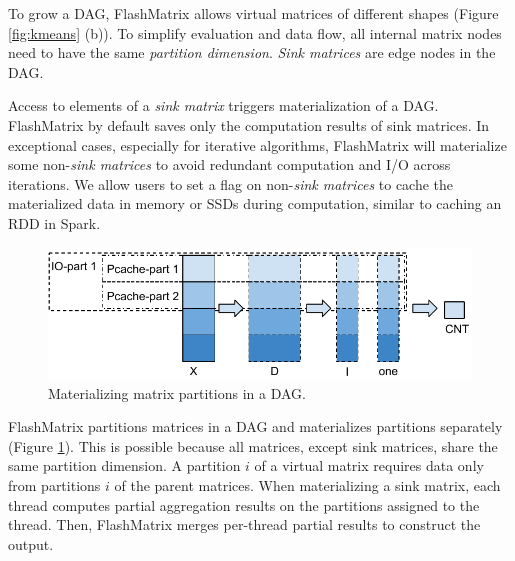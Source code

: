 To grow a DAG, FlashMatrix allows virtual matrices of different shapes
(Figure \ref{fig:kmeans} (b)). To simplify evaluation and data flow, 
all internal matrix nodes need to have the same
\textit{partition dimension}. \textit{Sink matrices} are edge nodes
in the DAG.

Access to elements of a \textit{sink matrix} triggers materialization of a DAG.
FlashMatrix by default saves only the computation results of sink matrices.
In exceptional cases, especially for iterative algorithms,
FlashMatrix will materialize some non-\textit{sink matrices} to avoid
redundant computation and I/O across iterations.  We allow users to
set a flag on non-\textit{sink matrices} to cache the materialized data in memory
or SSDs during computation, similar to caching an RDD in Spark.

\begin{figure}
	\centering
	\includegraphics[scale=0.6]{FlashMatrix_figs/materialize.pdf}
  \vspace{-4pt}
	\caption{Materializing matrix partitions in a DAG.}
	\label{fig:mater}
  \vspace{-8pt}
\end{figure}

FlashMatrix partitions matrices in a DAG and
materializes partitions separately (Figure \ref{fig:mater}). This is possible
because all matrices, except sink matrices, share the same partition dimension. 
A partition $i$ of a virtual matrix requires data only from partitions
$i$ of the parent matrices.
When materializing a sink matrix, each thread computes partial
aggregation results on the partitions assigned to the thread. 
Then, FlashMatrix merges per-thread partial results to construct the output.

